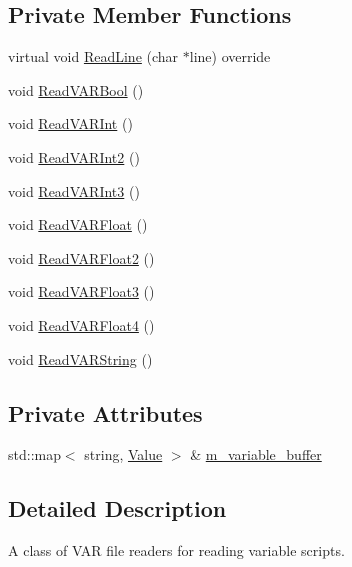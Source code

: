 \subsection*{Private Member Functions}
\begin{DoxyCompactItemize}
\item 
virtual void \hyperlink{classmage_1_1loader_1_1_v_a_r_reader_a9635d8d256066746be81d9c2d223961d}{Read\+Line} (char $\ast$line) override
\item 
void \hyperlink{classmage_1_1loader_1_1_v_a_r_reader_a2191e47d0806d408145422eb46e32ba1}{Read\+V\+A\+R\+Bool} ()
\item 
void \hyperlink{classmage_1_1loader_1_1_v_a_r_reader_a88a819066140cacd8ce494fca125e1e2}{Read\+V\+A\+R\+Int} ()
\item 
void \hyperlink{classmage_1_1loader_1_1_v_a_r_reader_a4e84ca5a6fabcf2ea29fbf32a5bdf1c4}{Read\+V\+A\+R\+Int2} ()
\item 
void \hyperlink{classmage_1_1loader_1_1_v_a_r_reader_a519dd541a8ee90bc83505d80e5dc1f49}{Read\+V\+A\+R\+Int3} ()
\item 
void \hyperlink{classmage_1_1loader_1_1_v_a_r_reader_a11f2ecdf718d1665a79406e7bebbc6f1}{Read\+V\+A\+R\+Float} ()
\item 
void \hyperlink{classmage_1_1loader_1_1_v_a_r_reader_ac80f8a30ffc67fc6f048cf32dd43c2e8}{Read\+V\+A\+R\+Float2} ()
\item 
void \hyperlink{classmage_1_1loader_1_1_v_a_r_reader_a133ffd4462be737377c0cdb921a90e75}{Read\+V\+A\+R\+Float3} ()
\item 
void \hyperlink{classmage_1_1loader_1_1_v_a_r_reader_a70dfe7e7e0b2fb9a79b6ff4342cc58dc}{Read\+V\+A\+R\+Float4} ()
\item 
void \hyperlink{classmage_1_1loader_1_1_v_a_r_reader_a4ccc6a48ca72707853ff910362318940}{Read\+V\+A\+R\+String} ()
\end{DoxyCompactItemize}
\subsection*{Private Attributes}
\begin{DoxyCompactItemize}
\item 
std\+::map$<$ string, \hyperlink{namespacemage_aa1fe0628487e0706e44efdc62dbdb3a2}{Value} $>$ \& \hyperlink{classmage_1_1loader_1_1_v_a_r_reader_a71291d47ea9f9d679bfd7584447ae6bb}{m\+\_\+variable\+\_\+buffer}
\end{DoxyCompactItemize}


\subsection{Detailed Description}
A class of V\+AR file readers for reading variable scripts. 

